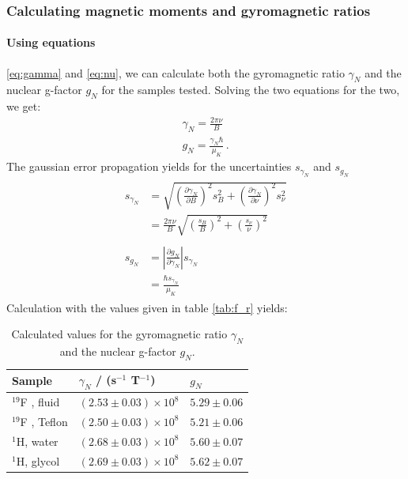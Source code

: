 \subsubsection{Calculating magnetic moments and gyromagnetic ratios}
\paragraph{Using equations}
\eqref{eq:gamma} and \eqref{eq:nu}, we can calculate both 
the gyromagnetic ratio $\gamma_N$ and the nuclear g-factor $g_N$ for the samples 
tested. Solving the two equations for the two, we get:
\begin{align}
    \gamma_N = \frac{2 \pi \nu}{B} \\
    g_N = \frac{\gamma_N \hbar}{\mu_K} \,.
\end{align}
The gaussian error propagation yields for the uncertainties $s_{\gamma_N}$ and $s_{g_N}$ 
\begin{align}
    \begin{split}
        s_{\gamma_N} &= \sqrt{
            \left(\frac{\partial \gamma_N}{\partial B}\right)^2 s_B^2 + 
            \left(\frac{\partial \gamma_N}{\partial \nu}\right)^2 s_\nu^2}  \\
        &= \frac{2 \pi \nu}{B}\sqrt{
            \left(\frac{s_B}{B}\right)^2 +\left(\frac{s_\nu}{\nu}\right)^2 }
    \end{split} \\
    \begin{split}
    s_{g_N} &= 
        \left|\frac{\partial g_N}{\partial \gamma_N}\right| s_{\gamma_N} \\
        &= \frac{\hbar s_{\gamma_N}}{\mu_K}
    \end{split}
\end{align}
Calculation with the values given in table \ref{tab:f_r} yields:
\renewcommand{\arraystretch}{1.5}
\begin{table}[H]
\centering
\begin{tabular}{|p{6.18cm}|p{3.82cm}|p{3.82cm}|}
        \hline
        \rowcolor{LightCyan}
        Sample & $\gamma_N$ / (s$^{-1}$ T$^{-1}$) & $g_N$ \\ \hline
        $^{19}$F , fluid    & $\left(2.53 \pm 0.03\right) \times 10^{8}$ & $5.29 \pm 0.06$ \\
        $^{19}$F , Teflon   & $\left(2.50 \pm 0.03\right) \times 10^{8}$ & $5.21 \pm 0.06$ \\
        $^1$H, water        & $\left(2.68 \pm 0.03\right) \times 10^{8}$ & $5.60 \pm 0.07$ \\
        $^1$H, glycol       & $\left(2.69 \pm 0.03\right) \times 10^{8}$ & $5.62 \pm 0.07$ \\
        \hline
    \end{tabular}
    \caption{
        Calculated values for the gyromagnetic ratio $\gamma_N$ and the nuclear g-factor $g_N$. 
        }
    \label{tab:g_N}
\end{table} 
